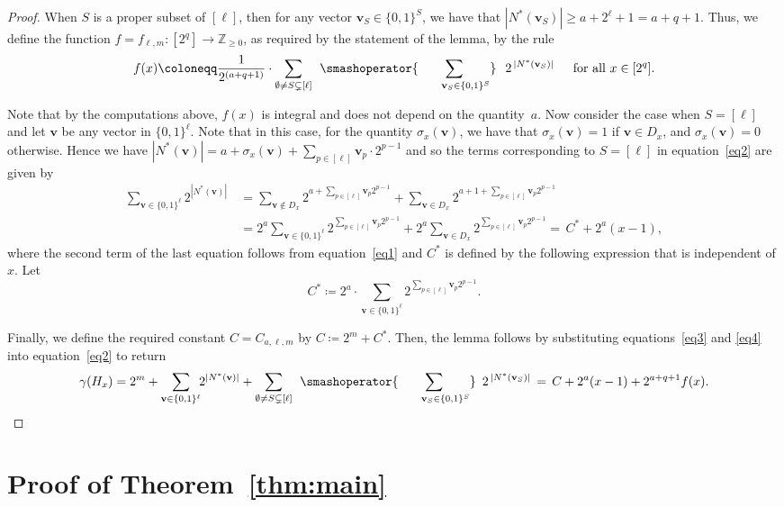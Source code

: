 \documentclass[11pt, final]{article}
\theoremstyle{definition}
\newcommand{\vv}{\textbf{v}}
\begin{document}
\begin{proof}
When $S$ is a proper subset of $[\ell]$, then for any vector $\vv_S \in \{0,1\}^S$, we have that $|N^*(\vv_S)| \geq a + 2^\ell + 1 = a + q + 1$. Thus, we define the function $f = f_{\ell,m}: [2^q] \to \mathbb{Z}_{\ge 0}$, as required by the statement of the lemma, by the rule 
\begin{equation}f(x) \coloneqq \frac{1}{2^{(a+q+1)}} \cdot\sum _{\emptyset \neq S \subsetneq [\ell]}\:\: \smashoperator{\sum_{\mkern 40mu\vv_S\in \{0,1\}^S}}\:\:\; 2^{\,|N^*(\vv_S)|}\, \quad \text{ for all $x \in [2^q]$}.\label{eq3} \end{equation}

Note that by the computations above, $f(x)$ is integral and does not depend on the quantity~$a$. Now consider the case when $S = [\ell]$ and let $\vv$ be any vector in $\{0,1\}^{\ell}$. Note that in this case, for the quantity $\sigma_x(\vv)$, we have that $\sigma_x(\vv) = 1$ if $\vv \in D_x$, and $\sigma_x(\vv) = 0$ otherwise. Hence we have $|N^*(\vv)| = a + \sigma_x(\vv) + \sum_{p \in [\ell]} \vv_p\cdot 2^{p-1}$ and so the terms corresponding to $S = [\ell]$ in equation~\eqref{eq2} are given by
\begin{equation}
\begin{split}
    \sum_{\vv \in \{0,1\}^\ell}\!\! 2^{|N^*(\vv)|}\, &= \sum_{\vv \notin D_x} 2^{a + \sum_{p \in [\ell]} \vv_p 2^{p-1}} + \sum_{\vv \in D_x} 2^{a + 1+  \sum_{p \in [\ell]} \vv_p 2^{p-1}}\\ &= 2^a\!\!\sum_{\vv \in \{0,1\}^\ell} 2^{\sum_{p \in [\ell]} \vv_p 2^{p-1}} + 2^a \sum_{\vv \in D_x} 2^{\sum_{p \in [\ell]} \vv_p 2^{p-1}} =\, C^* + 2^a(x-1), \label{eq4}
    \end{split}
\end{equation}
where the second term of the last equation follows from equation~\eqref{eq1} and $C^*$ is defined by the following expression that is independent of $x$. Let $$C^* \coloneqq 2^a\cdot\!\!\sum_{\vv \in \{0,1\}^\ell} 2^{\sum_{p \in [\ell]} \vv_p 2^{p-1}}.$$

Finally, we define the required constant $C = C_{a,\ell,m}$ by $C\coloneqq 2^{m}+C^*$. Then, the lemma follows by substituting equations~\eqref{eq3} and \eqref{eq4} into equation~\eqref{eq2} to return  
$$\gamma(H_x) = 2^m + \sum_{\vv \in \{0,1\}^\ell}\!\! 2^{|N^*(\vv)|} + \sum _{\emptyset \neq S \subsetneq [\ell]}\:\: \smashoperator{\sum_{\mkern 40mu\vv_S\in \{0,1\}^S}}\:\; 2^{\,|N^*(\vv_S)|}\, =\, C + 2^a(x-1) + 2^{a+q+1}f(x).$$
\end{proof}

\section{Proof of Theorem~\ref{thm:main}}
\label{sec:main_proof}
\end{document}
